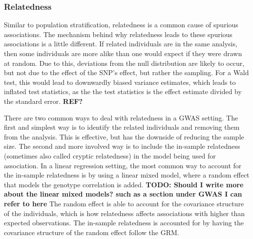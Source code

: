 \subsubsection{Relatedness}
Similar to population stratification, relatedness is a common cause of spurious associations. The mechanism behind why relatedness leads to these spurious associations is a little different. If related individuals are in the same analysis, then some individuals are more alike than one would expect if they were drawn at random. Due to this, deviations from the null distribution are likely to occur, but not due to the effect of the SNP's effect, but rather the sampling. For a Wald test, this would lead to downwardly biased variance estimates, which leads to inflated test statistics, as the the test statistics is the effect estimate divided by the standard error. \textbf{REF?}

There are two common ways to deal with relatedness in a GWAS setting. The first and simplest way is to identify the related individuals and removing them from the analysis. This is effective, but has the downside of reducing the sample size. The second and more involved way is to include the in-sample relatedness (sometimes also called cryptic relatedness) in the model being used for association. In a linear regression setting, the most common way to account for the in-sample relatedness is by using a linear mixed model, where a random effect that models the genotype correlation is added. \textbf{TODO: Should I write more about the linear mixed models? such as a section under GWAS I can refer to here} The random effect is able to account for the covariance structure of the individuals, which is how relatedness affects associations with higher than expected observations\cite{yu2006unified, kang2008efficient}. The in-sample relatedness is accounted for by having the covariance structure of the random effect follow the GRM.

